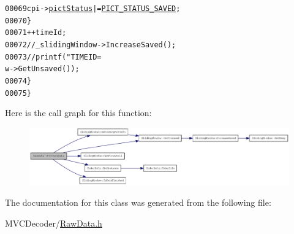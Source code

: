 \begin{footnotesize}
\begin{alltt}
00069                                 cpi->\hyperlink{struct_coding_pict_info_a41498e5ba764405481005e6569d7f728}{pictStatus} |= \hyperlink{_picture_info_8h_a81f2be9d3984eb16fa6f3b7daf46466f}{PICT_STATUS_SAVED};
00070                         \}
00071                         ++timeId;
00072                         \textcolor{comment}{//\_slidingWindow->IncreaseSaved();}
00073                         \textcolor{comment}{//printf("TIMEID=%
      w->GetUnsaved());}
00074                 \}
00075         \}
\end{alltt}\end{footnotesize}




Here is the call graph for this function:\nopagebreak
\begin{figure}[H]
\begin{center}
\leavevmode
\includegraphics[width=420pt]{class_raw_data_ac1edea5cb8ba51fd52541b415ba36ec2_cgraph}
\end{center}
\end{figure}




The documentation for this class was generated from the following file:\begin{DoxyCompactItemize}
\item 
MVCDecoder/\hyperlink{_raw_data_8h}{RawData.h}\end{DoxyCompactItemize}

